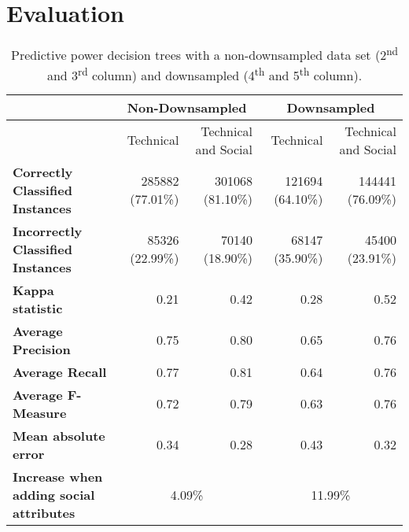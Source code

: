 \documentclass[10pt, conference]{IEEEtran}
\begin{document}
\section{Evaluation} \label{eval}
\begin{table*}[ht]
\centering
\begin{tabular}{l||r|r||r|r}
  & \multicolumn{2}{|c||}{Non-Downsampled}  & \multicolumn{2}{|c}{Downsampled} \\
\hline
  & Technical & Technical and Social & Technical & Technical and Social \\
\hline
	\textbf{Correctly Classified Instances}&  285882 (77.01\%) & 301068
	(81.10\%)  & 121694 (64.10\%) & 144441 (76.09\%)\\

	\textbf{Incorrectly Classified Instances}&  85326 (22.99\%) & 70140
	(18.90\%) & 68147 (35.90\%) &  45400 (23.91\%)\\

\textbf{Kappa statistic}& 0.21 &  0.42 & 0.28  & 0.52 \\
\textbf{Average Precision}& 0.75 & 0.80  & 0.65  & 0.76 \\
\textbf{Average Recall}& 0.77 & 0.81 & 0.64 & 0.76 \\
\textbf{Average F-Measure}& 0.72 & 0.79  & 0.63  & 0.76 \\



\textbf{Mean absolute error}& 0.34 &  0.28 & 0.43 & 0.32\\

\hline
\textbf{Increase when adding social attributes}& \multicolumn{2}{|c||}{4.09\%}  & \multicolumn{2}{|c}{11.99\%}\\

\hline
\end{tabular}
\\
\center
	\caption{\label{resultsTable} Predictive power 
      decision trees with a non-downsampled data set
	(2\textsuperscript{nd} and 3\textsuperscript{rd} column) and downsampled
	(4\textsuperscript{th} and 5\textsuperscript{th} column). 
	}   
\end{table*}
\end{document}
